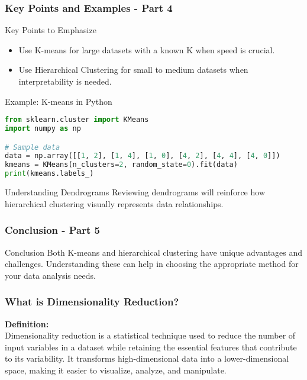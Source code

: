 \documentclass[aspectratio=169]{beamer}
\begin{document}
\begin{frame}[fragile]
    \frametitle{Key Points and Examples - Part 4}
    \begin{block}{Key Points to Emphasize}
        \begin{itemize}
            \item Use K-means for large datasets with a known K when speed is crucial.
            \item Use Hierarchical Clustering for small to medium datasets when interpretability is needed.
        \end{itemize}
    \end{block}
    
    \begin{block}{Example: K-means in Python}
        \begin{lstlisting}[language=Python]
from sklearn.cluster import KMeans
import numpy as np

# Sample data
data = np.array([[1, 2], [1, 4], [1, 0], [4, 2], [4, 4], [4, 0]])
kmeans = KMeans(n_clusters=2, random_state=0).fit(data)
print(kmeans.labels_)
        \end{lstlisting}
    \end{block}
    
    \begin{block}{Understanding Dendrograms}
        Reviewing dendrograms will reinforce how hierarchical clustering visually represents data relationships.
    \end{block}
\end{frame}

\begin{frame}[fragile]
    \frametitle{Conclusion - Part 5}
    \begin{block}{Conclusion}
        Both K-means and hierarchical clustering have unique advantages and challenges. Understanding these can help in choosing the appropriate method for your data analysis needs.
    \end{block}
\end{frame}

\begin{frame}[fragile]
    \frametitle{What is Dimensionality Reduction?}
    \textbf{Definition:} \\[10pt]
    Dimensionality reduction is a statistical technique used to reduce the number of input variables in a dataset while retaining the essential features that contribute to its variability.
    It transforms high-dimensional data into a lower-dimensional space, making it easier to visualize, analyze, and manipulate.
\end{frame}
\end{document}
